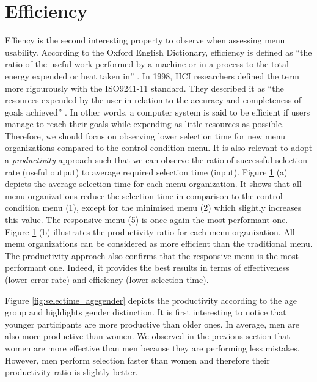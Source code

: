 \section{Efficiency}
Effiency is the second interesting property to observe when assessing menu 
usability. According to the Oxford English Dictionary, efficiency is defined as 
\enquote{the ratio of the useful work performed by a machine or in a process to 
the total energy expended or heat taken in} \cite{efficiency}. In 1998, HCI 
researchers defined the term more rigourously with the ISO9241-11 standard. 
They described it as \enquote{the resources expended by the user in relation to 
the 
accuracy and completeness of goals achieved} \cite{iso}. In other 
words, a computer system is said to be efficient if users manage to reach 
their goals while expending as little resources as possible. Therefore, we 
should 
focus on observing lower selection time for new menu organizations compared to 
the 
control condition menu. It is also relevant to adopt a \textit{productivity} 
approach such that we can observe the ratio of successful selection rate 
(useful output) to average required selection time (input). Figure 
\ref{fig:selectime} (a) depicts the average selection time for 
each menu organization. It shows that all menu organizations reduce the 
selection time in comparison to the control condition menu (1), except for the 
minimised menu (2) which slightly increases this value. The responsive 
menu (5) is once again the most performant one. Figure 
\ref{fig:selectime} (b) illustrates the productivity ratio for each menu 
organization. All menu organizations can be considered as more efficient than 
the traditional menu. The productivity approach also confirms that the 
responsive menu is the most performant one. Indeed, it provides the best 
results 
in terms of effectiveness (lower error rate) and efficiency (lower selection 
time).

\begin{figure}[!ht]
    
    \label{fig:selectime}
\end{figure}

Figure \ref{fig:selectime_agegender} depicts the productivity according 
to the age group and highlights gender distinction. It is first 
interesting to notice that younger participants are more productive 
than older ones. In average, men are also more productive than women. We 
observed in the previous section that women are more effective than men 
because they are performing less mistakes. However, men perform selection 
faster than women and therefore their productivity ratio is slightly 
better.

